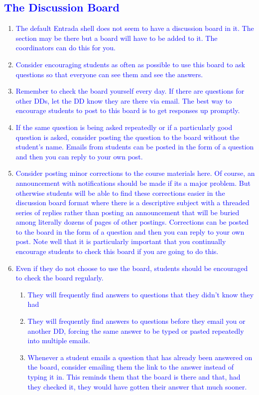 \documentclass[11pt]{article}
\newcommand{\trsem}[1]{\textcolor{blue}{#1}}
\begin{document}
\subsection*{\trsem{The Discussion Board}}
  \def\labelenumi{\trsem{\arabic{enumi}.}}
  \begin{enumerate}
\item \trsem{The default Entrada shell does not seem to have a discussion board in it.  The section may be there but a board will have to be added to it.  The coordinators can do this for you.}
\item \trsem{Consider encouraging students as often as possible to use this board to ask questions so that everyone can see them and see the answers.}
\item \trsem{Remember to check the board yourself every day.  If there are questions for other DDs, let the DD know they are there via email.  The best way to encourage students to post to this board is to get responses up promptly.}
\item \trsem{If the same question is being asked repeatedly or if a particularly good question is asked, consider posting the question to the board without the student's name.  Emails from students can be posted in the form of a question and then you can reply to your own post.}
\item \trsem{Consider posting minor corrections to the course materials here.  Of course, an announcement with notifications should be made if its a major problem.  But otherwise students will be able to find these corrections easier in the discussion board format where there is a descriptive subject with a threaded series of replies rather than posting an announcement that will be buried among literally dozens of pages of other postings.  Corrections can be posted to the board in the form of a question and then you can reply to your own post.  Note well that it is particularly important that you continually encourage students to check this board if you are going to do this.}
\item \trsem{Even if they do not choose to use the board, students should be encouraged to check the board regularly.}

  \begin{enumerate}
      \def\labelenumii{\trsem{\alph{enumii}.}}
  \item \trsem{They will frequently find answers to questions that they didn't know they had}
  \item \trsem{They will frequently find answers to questions before they email you or another DD, forcing the same answer to be typed or pasted repeatedly into multiple emails.}
  \item \trsem{Whenever a student emails a question that has already been answered on the board, consider emailing them the link to the answer instead of typing it in.  This reminds them that the board is there and that, had they checked it, they would have gotten their answer that much sooner.}
  \end{enumerate}

\end{enumerate}
\end{document}
